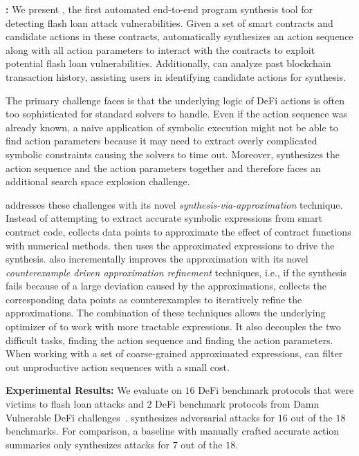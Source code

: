 \noindent \textbf{\name:}
We present {\name}, the first automated end-to-end program synthesis tool for
detecting flash loan attack vulnerabilities. Given a set of smart contracts and
candidate actions in these contracts, {\name} automatically synthesizes an
action sequence along with all action parameters to interact with the contracts
to exploit potential flash loan vulnerabilities. 
Additionally, {\name} can analyze past blockchain transaction history,
assisting users in identifying candidate actions for synthesis.

The primary challenge {\name} faces is that the underlying logic of DeFi actions
is often too sophisticated for standard solvers to handle. Even
if the action sequence was already known, a naive application of symbolic
execution might not be able to find action parameters because it may need to extract
overly complicated symbolic constraints causing the solvers to
time out. Moreover, {\name} synthesizes the action sequence and the action
parameters together and therefore faces an additional search space explosion
challenge.

{\name} addresses these challenges with its novel
\emph{synthesis-via-approximation} technique. Instead of attempting to extract
accurate symbolic expressions from smart contract code, {\name} collects data
points to approximate the effect of contract functions with numerical methods. {\name} then uses the approximated expressions to drive the
synthesis. {\name} also incrementally improves the approximation with its novel
\emph{counterexample driven approximation refinement} techniques, i.e., if the
synthesis fails because of a large deviation caused by the approximations,
{\name} collects the corresponding data points as counterexamples to
iteratively refine the approximations. The combination of these techniques
allows the underlying optimizer of {\name} to work with more tractable
expressions. It also decouples the two difficult tasks, finding the action
sequence and finding the action parameters. When working with a set of
coarse-grained approximated expressions, {\name} can filter out unproductive
action sequences with a small cost.

\noindent \textbf{Experimental Results:} 
We evaluate {\name} on $16$ DeFi benchmark protocols that were victims to flash
loan attacks and $2$ DeFi benchmark protocols from Damn Vulnerable DeFi
challenges~\cite{DVD}. {\name} synthesizes adversarial attacks for $16$ out
of the $18$ benchmarks. For comparison, a baseline with manually crafted
accurate action summaries only synthesizes attacks for $7$ out of the $18$.

